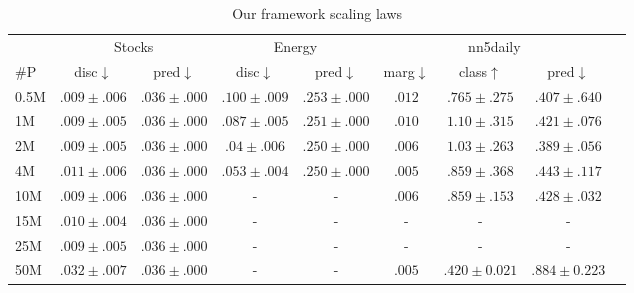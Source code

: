 \documentclass{article}
\begin{document}
\begin{table}[!ht]
    \centering
    \caption{Our framework scaling laws}
    \label{tab:our_framework_scaling_laws}
    \setlength{\tabcolsep}{3.8pt}
    \begin{tabular}{l|c|c|c|c|c|c|c|c}
        \toprule
        & \multicolumn{2}{c|}{Stocks} & \multicolumn{2}{c|}{Energy} & \multicolumn{3}{c|}{nn5daily} \\
        $\#$P & disc$\downarrow$ & pred$\downarrow$ & disc$\downarrow$ & pred$\downarrow$ & marg$\downarrow$ & class$\uparrow$ & pred$\downarrow$ \\
        \midrule
        0.5M & $ .009 \pm .006$ & $.036 \pm .000$ & $.100 \pm .009$ & $.253 \pm .000 $ & $.012$ & $.765 \pm .275 $ & $.407 \pm .640$ \\ 
        1M & $ .009 \pm .005$ & $.036 \pm .000$ & $.087 \pm .005$ & $.251 \pm .000 $  & $.010$ & $1.10 \pm .315$ & $.421 \pm .076$ \\ 
        2M & $ .009 \pm .005$ & $.036 \pm .000 $ & $.04 \pm .006$ & $.250 \pm .000 $ & $.006$ & $1.03 \pm .263$ & $.389 \pm .056$ \\ 
        4M & $ .011 \pm .006$ & $.036 \pm .000$ & $.053 \pm .004$ & $.250 \pm .000 $ & $.005$ & $.859 \pm .368$ & $.443 \pm .117$ \\
        10M & $ .009 \pm .006$ & $.036 \pm .000$ & - & - & $.006$ & $.859 \pm .153$ & $.428 \pm .032$ \\
        15M & $ .010 \pm .004$ & $.036 \pm .000$ & - & - & - & - & - \\
        25M & $ .009 \pm .005$ & $.036 \pm .000$ & - & - & - & - & - \\
        50M & $ .032 \pm .007$ & $.036 \pm .000$ & - & - & $.005$ & $.420 \pm 0.021$ & $.884 \pm 0.223$ \\
        \bottomrule
    \end{tabular}
\end{table}
\end{document}
